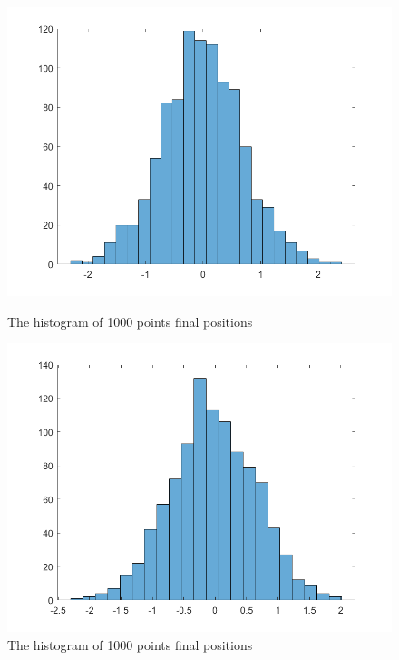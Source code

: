 \documentclass{article}
\begin{document}
\begin{figure}[H]
    \centering
    \begin{minipage}{0.45\linewidth}
        \centering
        \includegraphics[width=\linewidth]{walk1000.png}
        \caption{The histogram of 1000 points final positions}
    \end{minipage}
    \hfill
    \begin{minipage}{0.45\linewidth}
        \centering
        \includegraphics[width=\linewidth]{walk10001.png}
        \caption{The histogram of 1000 points final positions}
    \end{minipage}
\end{figure}
\clearpage
\end{document}
